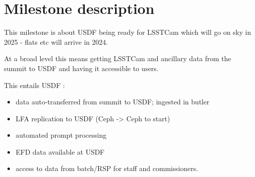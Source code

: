 \section{Milestone description} \label{sec:definition}

This milestone is about USDF being ready for LSSTCam which will go on sky in 2025 - flats etc will arrive in 2024.

At a broad level this means getting LSSTCam and ancillary data from the summit to USDF and having it accessible to users.

This entails USDF :

\begin{itemize}
\item data auto-transferred from summit to USDF; ingested in butler
\item LFA replication to USDF (Ceph -> Ceph to start)
\item automated prompt processing
\item EFD data available at USDF
\item access to data from batch/RSP for staff and commissioners.
\end{itemize}
